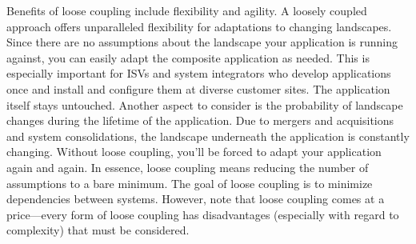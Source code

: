 	Benefits of loose coupling include flexibility and agility. A loosely coupled approach offers unparalleled flexibility for adaptations to changing landscapes. Since there are no assumptions about the landscape your application is running against, you can easily adapt the composite application as needed. This is especially important for ISVs and system integrators who develop applications once and install and configure them at diverse customer sites. The application itself stays untouched. Another aspect to consider is the probability of landscape changes during the lifetime of the application. Due to mergers and acquisitions and system consolidations, the landscape underneath the application is constantly changing. Without loose coupling, you'll be forced to adapt your application again and again. In essence, loose coupling means reducing the number of assumptions to a bare minimum. The goal of loose coupling is to minimize dependencies between systems. However, note that loose coupling comes at a price---every form of loose coupling has disadvantages (especially with regard to complexity) that must be considered.

